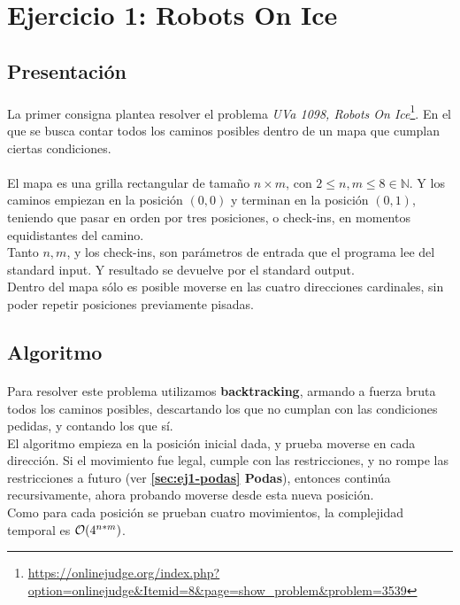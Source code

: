 \documentclass[./main.tex]{subfiles}
\begin{document}
\section{Ejercicio 1: Robots On Ice}
\label{sec:ej1}

\subsection{Presentación}
\label{sec:ej1-intro}

\paragraph{} La primer consigna plantea resolver el problema \textit{UVa 1098, Robots On Ice}\footnote{\url{https://onlinejudge.org/index.php?option=onlinejudge&Itemid=8&page=show_problem&problem=3539}}. En el que se busca contar todos los caminos posibles dentro de un mapa que cumplan ciertas condiciones.

\paragraph{} El mapa es una grilla rectangular de tamaño \(n \times m\), con \(2 \leq n, m \leq 8 \in \mathbb{N}\). Y los caminos empiezan en la posición \((0, 0)\) y terminan en la posición \((0, 1)\), teniendo que pasar en orden por tres posiciones, o check-ins, en momentos equidistantes del camino. \\
Tanto \(n, m\), y los check-ins, son parámetros de entrada que el programa lee del standard input. Y resultado se devuelve por el standard output. \\
\indent Dentro del mapa sólo es posible moverse en las cuatro direcciones cardinales, sin poder repetir posiciones previamente pisadas.

\subsection{Algoritmo}
\label{sec:ej1-algo}

\paragraph{} Para resolver este problema utilizamos \textbf{backtracking}, armando a fuerza bruta todos los caminos posibles, descartando los que no cumplan con las condiciones pedidas, y contando los que sí. \\
\indent El algoritmo empieza en la posición inicial dada, y prueba moverse en cada dirección. Si el movimiento fue legal, cumple con las restricciones, y no rompe las restricciones a futuro (ver \textbf{\ref{sec:ej1-podas} Podas}), entonces continúa recursivamente, ahora probando moverse desde esta nueva posición. \\
\indent Como para cada posición se prueban cuatro movimientos, la complejidad temporal es \(\mathcal{O}(4^{n*m})\).
\end{document}
